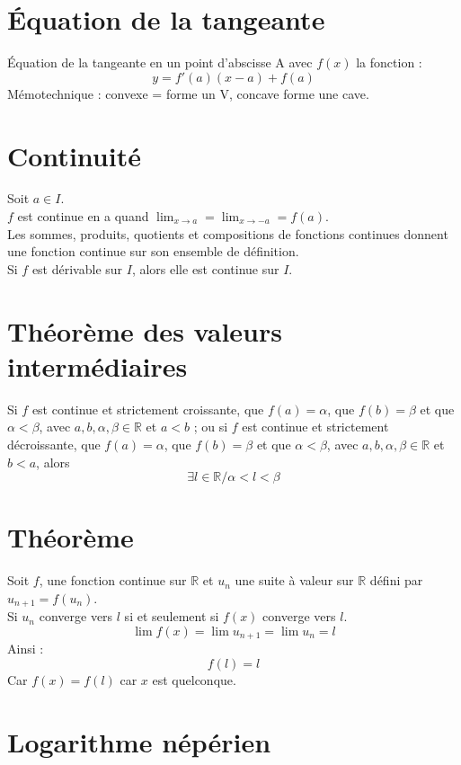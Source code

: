\documentclass{article}
\begin{document}
	\section{Équation de la tangeante}

	Équation de la tangeante en un point d'abscisse A avec $f(x)$ la fonction :
	\[ y=f'(a)(x-a)+f(a) \]
	Mémotechnique : convexe = forme un V, concave forme une cave.
	
	\section{Continuité}

	Soit $a\in I$. \\
	$f$ est continue en a quand $\lim_{x \to a} = \lim_{x\to -a} = f(a)$. \\
	Les sommes, produits, quotients et compositions de fonctions continues donnent une fonction continue sur son ensemble de définition. \\
	Si $f$ est dérivable sur $I$, alors elle est continue sur $I$.

	\section{Théorème des valeurs intermédiaires}

	Si $f$ est continue et strictement croissante, que $f(a) = \alpha$, que $f(b) = \beta$ et que $\alpha < \beta$, avec $a,b,\alpha,\beta \in \mathbb{R}$ et $a<b$ ; ou si $f$ est continue et strictement décroissante, que $f(a) = \alpha$, que $f(b) = \beta$ et que $\alpha < \beta$, avec $a,b,\alpha,\beta \in \mathbb{R}$ et $b<a$, alors
	\[ \exists l \in \mathbb{R} / \alpha < l < \beta \]

	\section{Théorème}

	Soit $f$, une fonction continue sur $\mathbb{R}$ et $u_n$ une suite à valeur sur $\mathbb{R}$ défini par $u_{n+1} = f(u_n)$. \\
	Si $u_n$ converge vers $l$ si et seulement si $f(x)$ converge vers $l$. 
	\[ \lim f(x) = \lim u_{n+1} = \lim u_n = l \]
	Ainsi :
	\[ f(l) = l \]
	Car $f(x) = f(l)$ car $x$ est quelconque.


	\section{Logarithme népérien}
\end{document}
